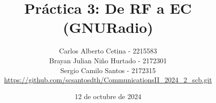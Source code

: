 \documentclass{journal}[IEEEtran, twocolumn]             %
\newcommand{\dochead}{Práctica 3}
\newcommand{\docsubhead}{De RF a EC (GNURadio)}
\newcommand{\titulo}{\dochead: \docsubhead}
\newcommand{\fecha}{12 de octubre de 2024}
\begin{document}

\title{\textbf{\titulo}}            %

\author{
Carlos Alberto Cetina - 2215583\\
Brayan Julian Niño Hurtado - 2172301\\
Sergio Camilo Santos - 2172315\\
\href{https://github.com/scsantosdth/CommunicationsII_2024_2_scb.git}{https://github.com/scsantosdth/CommunicationsII_2024_2_scb.git}
}


\date{\fecha}                       %

\maketitle                          %
\thispagestyle{fancy}          %

%


\color{black}
\end{document}
